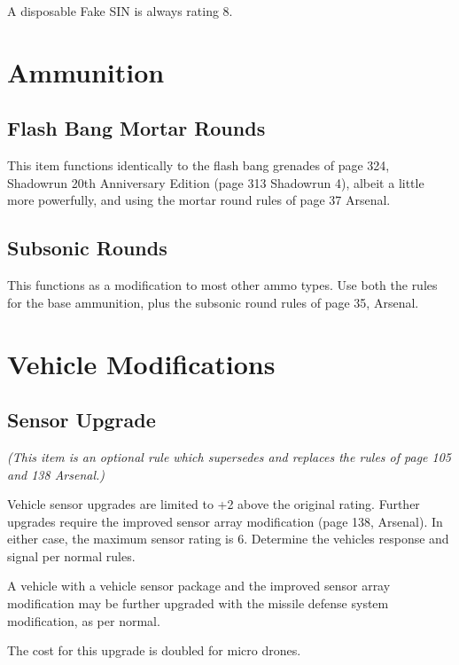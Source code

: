 \documentclass{article}
\begin{document}
A disposable Fake SIN is always rating 8.

\section*{Ammunition}

\subsection*{Flash Bang Mortar Rounds}

 This item functions identically to the flash bang grenades of page 324, Shadowrun 20th Anniversary Edition (page 313 Shadowrun 4), albeit a little more powerfully, and using the mortar round rules of page 37 Arsenal. 

\subsection*{Subsonic Rounds}

  This functions as a modification to most other ammo types.  Use both the rules for the base ammunition, plus the subsonic round rules of page 35, Arsenal.

\section*{Vehicle Modifications}

\subsection*{Sensor Upgrade}

\emph{(This item is an optional rule which supersedes and replaces the rules of page 105 and 138 Arsenal.)}

 Vehicle sensor upgrades are limited to +2 above the original rating. Further upgrades require the improved sensor array modification (page 138, Arsenal).  In either case, the maximum sensor rating is 6. Determine the vehicles response and signal per normal rules.

 A vehicle with a vehicle sensor package and the improved sensor array modification may be further upgraded with the missile defense system modification, as per normal.

 The cost for this upgrade is doubled for micro drones.

\onecolumn
\end{document}

